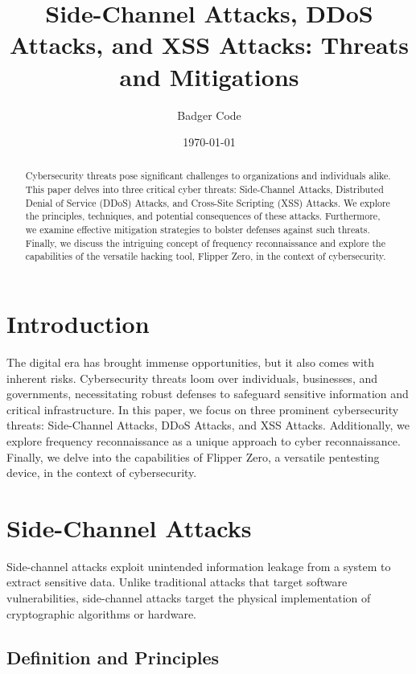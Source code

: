 \documentclass{article}
\title{Side-Channel Attacks, DDoS Attacks, and XSS Attacks: Threats and Mitigations}
\author{Badger Code}
\date{\today}
\begin{document}
\maketitle

\begin{abstract}
    Cybersecurity threats pose significant challenges to organizations and individuals alike. This paper delves into three critical cyber threats: Side-Channel Attacks, Distributed Denial of Service (DDoS) Attacks, and Cross-Site Scripting (XSS) Attacks. We explore the principles, techniques, and potential consequences of these attacks. Furthermore, we examine effective mitigation strategies to bolster defenses against such threats. Finally, we discuss the intriguing concept of frequency reconnaissance and explore the capabilities of the versatile hacking tool, Flipper Zero, in the context of cybersecurity.
\end{abstract}

\section{Introduction}

The digital era has brought immense opportunities, but it also comes with inherent risks. Cybersecurity threats loom over individuals, businesses, and governments, necessitating robust defenses to safeguard sensitive information and critical infrastructure. In this paper, we focus on three prominent cybersecurity threats: Side-Channel Attacks, DDoS Attacks, and XSS Attacks. Additionally, we explore frequency reconnaissance as a unique approach to cyber reconnaissance. Finally, we delve into the capabilities of Flipper Zero, a versatile pentesting device, in the context of cybersecurity.

\section{Side-Channel Attacks}

Side-channel attacks exploit unintended information leakage from a system to extract sensitive data. Unlike traditional attacks that target software vulnerabilities, side-channel attacks target the physical implementation of cryptographic algorithms or hardware.

\subsection{Definition and Principles}
\end{document}
